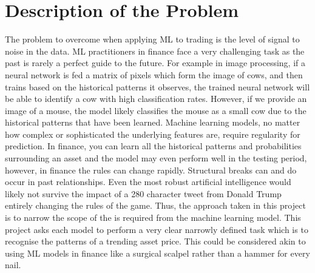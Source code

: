 \documentclass[11pt]{article}
\begin{document}
\section{Description of the Problem} \label{ProbDes}

The problem to overcome when applying ML to trading is the level of signal to noise in the data. ML practitioners in finance face a very challenging task as the past is rarely a perfect guide to the future. For example in image processing, if a neural network is fed a matrix of pixels which form the image of cows, and then trains based on the historical patterns it observes, the trained neural network will be able to identify a cow with high classification rates. However, if we provide an image of a mouse, the model likely classifies the mouse as a small cow due to the historical patterns that have been learned. Machine learning models, no matter how complex or sophisticated the underlying features are, require regularity for prediction. In finance, you can learn all the historical patterns and probabilities surrounding an asset and the model may even perform well in the testing period, however, in finance the rules can change rapidly. Structural breaks can and do occur in past relationships. Even the most robust artificial intelligence would likely not survive the impact of a 280 character tweet from Donald Trump entirely changing the rules of the game. Thus, the approach taken in this project is to narrow the scope of the is required from the machine learning model. This project asks each model to perform a very clear narrowly defined  task which is to recognise the patterns of a trending asset price. This could be considered akin to using ML models in finance like a surgical scalpel rather than a hammer for every nail.
\end{document}
